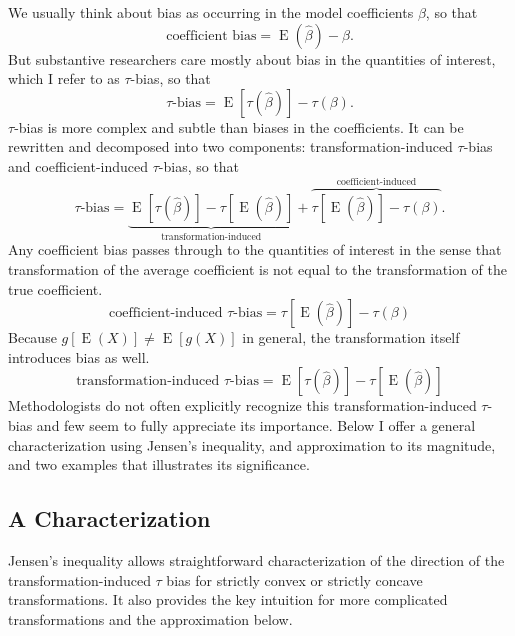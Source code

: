 \documentclass[12pt]{article}
\DeclareMathOperator*{\E}{\text{E}}
\begin{document}
We usually think about bias as occurring in the model coefficients $\beta$, so that 
\begin{equation}
\text{coefficient bias} = \E(\hat{\beta}) - \beta \text{.}  \nonumber
\end{equation}
But substantive researchers care mostly about bias in the quantities of interest, which I refer to as $\tau$-bias, so that
\begin{equation}
\tau\text{-bias} = \E[\tau(\hat{\beta})] - \tau(\beta)\text{.} \nonumber
\end{equation}
$\tau$-bias is more complex and subtle than biases in the coefficients. It can be rewritten and decomposed into two components: transformation-induced $\tau$-bias and coefficient-induced $\tau$-bias, so that
\begin{equation}
\tau\text{-bias}= \underbrace{ \E[\tau(\hat{\beta})]-  \tau[\E(\hat{\beta})]  }_{\text{transformation-induced}} + \overbrace{  \tau[\E(\hat{\beta})] - \tau(\beta)  }^{\text{coefficient-induced}}\text{.} \nonumber
\end{equation}
Any coefficient bias passes through to the quantities of interest in the sense that transformation of the average coefficient is not equal to the transformation of the true coefficient.
\begin{equation}
\text{coefficient-induced } \tau\text{-bias} = \tau[\E(\hat{\beta})] - \tau(\beta) \nonumber
\end{equation}
Because $g[\E(X)] \neq \E[g(X)]$ in general, the transformation itself introduces bias as well. 
\begin{equation}
\text{transformation-induced } \tau\text{-bias} = \E[\tau(\hat{\beta})]-  \tau[\E(\hat{\beta})] \nonumber
\end{equation}
Methodologists do not often explicitly recognize this transformation-induced $\tau$-bias and few seem to fully appreciate its importance. Below I offer a general characterization using Jensen's inequality, and approximation to its magnitude, and two examples that illustrates its significance.


\subsection*{A Characterization}

Jensen's inequality allows straightforward characterization of the direction of the transformation-induced $\tau$ bias for strictly convex or strictly concave transformations. It also provides the key intuition for more complicated transformations and the approximation below.
\end{document}
